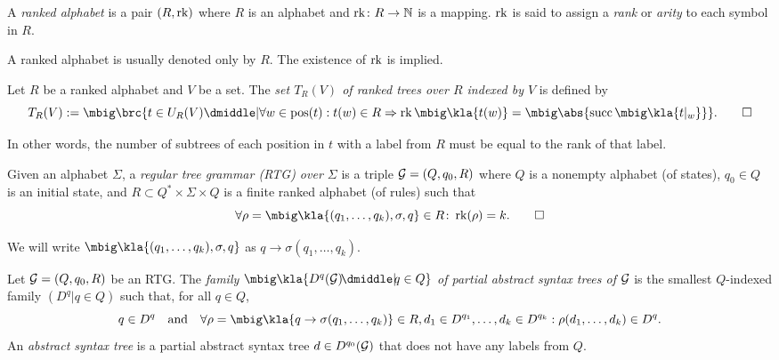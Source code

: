 \begin{definition}
 A \emph{ranked alphabet} is a pair $(R,\operatorname{rk})$ where $R$ is an alphabet and
 $\operatorname{rk}\colon R\to\mathbb N$ is a mapping. $\operatorname{rk}$ is said to assign a \emph{rank} or
 \emph{arity} to each symbol in $R$.
\end{definition}

A ranked alphabet is usually denoted only by $R$. The existence of $\operatorname{rk}$ is implied.

\begin{definition}
 Let $R$ be a ranked alphabet and $V$ be a set. The \emph{set $T_R(V)$ of
 ranked trees over $R$ indexed by $V$} is defined by
 \[
  T_R(V) := \mbig\brc{t \in U_R(V) \dmiddle| \forall w\in\pos(t): t(w)\in R\Rightarrow \rk\mbig\kla{t(w)} = \mbig\abs{\osucc\mbig\kla{t|_w}}}.
  \qedhere
 \]
\end{definition}

In other words, the number of subtrees of each position in $t$ with a label from
$R$ must be equal to the rank of that label.

\begin{definition}
 Given an alphabet $\Sigma$, a \emph{regular tree grammar (RTG) over $\Sigma$}
 is a triple $\mathcal G = (Q,q_0,R)$ where $Q$ is a nonempty alphabet (of states),
 $q_0\in Q$ is an initial state, and $R\subset Q^*\times\Sigma\times Q$ is a
 finite ranked alphabet (of rules) such that
 \[
  \forall \rho = \mbig\kla{(q_1,\ldots,q_k),\sigma,q}\in R\colon \rk(\rho) = k.
  \qedhere
 \]
\end{definition}

We will write $\mbig\kla{(q_1,\ldots,q_k),\sigma,q}$ as $q\to\sigma(q_1,\ldots,q_k)$.

\begin{definition}\label{def:02-past}
 Let $\mathcal G=(Q,q_0,R)$ be an RTG. The \emph{family
 $\mbig\kla{D^q(\ug)\!\dmiddle|\!q\in Q}$ of partial abstract syntax trees of
 $\mathcal G$} is the smallest $Q$-indexed family $(D^q|q\in Q)$ such that, for all
 $q\in Q$,
 \[
  q \in D^q \quad\text{and}\quad \forall \rho=\mbig\kla{q\to\sigma(q_1,\ldots,q_k)}\in R,d_1\in D^{q_1},\ldots,d_k\in D^{q_k}: \rho(d_1,\ldots,d_k) \in D^q.
 \]
 An \emph{abstract syntax tree} is a partial abstract syntax tree $d\in
 D^{q_0}(\mathcal G)$ that does not have any labels from $Q$.
\end{definition}


